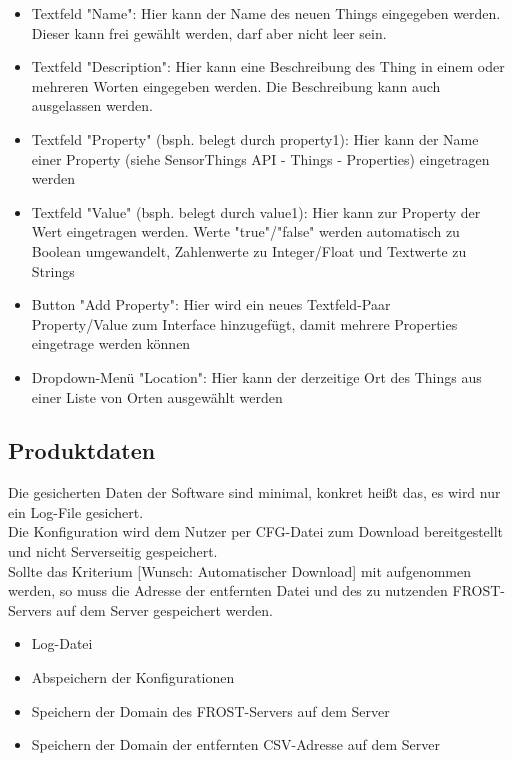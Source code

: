 \documentclass[12 pt]{article}
\begin{document}
\begin{itemize}
		\item Textfeld "Name": Hier kann der Name des neuen Things eingegeben werden. Dieser kann frei gewählt werden, darf aber nicht leer sein.
		\item Textfeld "Description": Hier kann eine Beschreibung des Thing in einem oder mehreren Worten eingegeben werden. Die Beschreibung kann auch ausgelassen werden.
		\item Textfeld "Property" (bsph. belegt durch property1): Hier kann der Name einer Property (siehe SensorThings API - Things - Properties) eingetragen werden
		\item Textfeld "Value" (bsph. belegt durch value1): Hier kann zur Property der Wert eingetragen werden. Werte "true"/"false" werden automatisch zu Boolean umgewandelt, Zahlenwerte zu Integer/Float und Textwerte zu Strings
		\item Button \string"Add Property": Hier wird ein neues Textfeld-Paar \\Property/Value zum Interface hinzugefügt, damit mehrere Properties eingetrage werden können
		\item Dropdown-Menü "Location": Hier kann der derzeitige Ort des Things aus einer Liste von Orten ausgewählt werden
	\end{itemize}
	
	
	\subsection{Produktdaten}
	Die gesicherten Daten der Software sind minimal, konkret heißt das, es wird nur ein Log-File gesichert. \\Die Konfiguration wird dem Nutzer per CFG-Datei zum Download bereitgestellt und nicht Serverseitig gespeichert.\\
	Sollte das Kriterium [Wunsch: Automatischer Download] mit aufgenommen werden, so muss die Adresse der entfernten Datei und des zu nutzenden FROST-Servers auf dem Server gespeichert werden.
	\begin{itemize}
		\item Log-Datei
		\item Abspeichern der Konfigurationen
		\item Speichern der Domain des FROST-Servers auf dem Server
		\item Speichern der Domain der entfernten CSV-Adresse auf dem Server
	\end{itemize}
	
\end{document}
